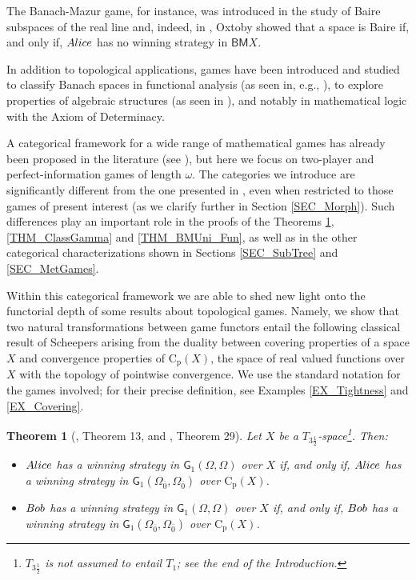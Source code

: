 \documentclass[12pt]{amsart}
\newtheorem{thm}{Theorem}[section]
\theoremstyle{definition}
\newcommand{\W}{{\Omega}}
\newcommand{\g}{\mathsf{G}}
\newcommand{\ali}{\textup{\textmd{\textsc{Alice}}}}
\newcommand{\bob}{\textup{\textmd{\textsc{Bob}}}}
\newcommand{\Cp}{\mathrm{C}_{\mathrm {p}}}
\newcommand{\BM}{\mathsf{B}\mathsf{M}}
\begin{document}
The Banach-Mazur game, for instance, was introduced in the study of Baire subspaces of the real line and, indeed, in \cite{Oxtoby1957}, Oxtoby showed that a space is Baire if, and only if, $\ali$ has no winning strategy in $\BM X$. 

In addition to topological applications, games have been introduced and studied to classify Banach spaces in functional analysis (as seen in, e.g., \cite{Ferenczi2009}), to explore properties of algebraic structures (as seen in \cite{Brandenburg2018}), and notably in mathematical logic with the Axiom of Determinacy.

A categorical framework for a wide range of mathematical games has already been proposed in the literature (see \cite{Streufert2018, Streufert2020, Streufert2021}), but here we focus on two-player and perfect-information games of length $\omega$. The categories we introduce are significantly different from the one presented in \cite{Streufert2021}, even when restricted to those games of present interest (as we clarify further in Section \ref{SEC_Morph}). Such differences play an important role in the proofs of the Theorems \ref{THM_ClassOmega}, \ref{THM_ClassGamma} and \ref{THM_BMUni_Fun}, as well as in the other categorical characterizations shown in Sections \ref{SEC_SubTree} and \ref{SEC_MetGames}. 

Within this categorical framework we are able to shed new light onto the functorial depth of some results about topological games. Namely, we show that two natural transformations between game functors entail the following classical result of Scheepers \cite{Scheepers1997, Scheepers2014} arising from the duality between covering properties of a space $X$ and convergence properties of $\mathrm{C_p}(X)$, the space of real valued functions over $X$ with the topology of pointwise convergence. We use the standard notation for the games involved; for their precise definition, see Examples \ref{EX_Tightness} and \ref{EX_Covering}.

\begin{thm}[\cite{Scheepers1997}, Theorem 13, and \cite{Scheepers2014}, Theorem 29]\label{THM_ClassOmega}
	Let $X$ be a $T_{3\frac{1}{2}}$-space\footnote{$T_{3\frac{1}{2}}$ is not assumed to entail $T_1$; see the end of the Introduction.}. Then:
	\begin{itemize}
		\item $\ali$ has a winning strategy in $\g_1(\W,\W)$ over $X$ if, and only if, $\ali$ has a winning strategy in $\g_1(\W_{\bar{0}},\W_{\bar{0}})$ over $\Cp(X)$.
		\item $\bob$ has a winning strategy in $\g_1(\W,\W)$ over $X$ if, and only if, $\bob$ has a winning strategy in $ \g_1(\W_{\bar{0}},\W_{\bar{0}})$ over $\Cp(X)$. 
	\end{itemize}
\end{thm}
\end{document}
